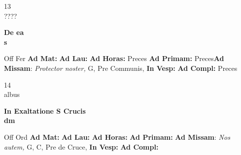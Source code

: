 \documentclass[10pt, openany]{book}
\begin{document}
    \begin{center}
        \begin{minipage}{3.5in}
            \vspace{2em}
            \begin{minipage}{0.5in}
                {\Huge 13} \\
                {\normalsize ????}
            \end{minipage}
            \begin{minipage}{3.0in}
                \textbf{ \large De ea \\
                \textnormal{\normalsize s}}

            \end{minipage}
            \begin{justify}Off Fer
                \textbf{Ad Mat: }
                \textbf{Ad Lau: }
                \textbf{Ad Horas: }Preces
                \textbf{Ad Primam: }Preces\textbf{Ad Missam}: \textit{Protector noster,} G, Pre Communis, 
                \textbf{In Vesp: }
                \textbf{Ad Compl: }Preces
            \end{justify}
        \end{minipage}
    \end{center}

    \begin{center}
        \begin{minipage}{3.5in}
            \vspace{2em}
            \begin{minipage}{0.5in}
                {\Huge 14} \\
                {\normalsize albus}
            \end{minipage}
            \begin{minipage}{3.0in}
                \textbf{ \large In Exaltatione S Crucis \\
                \textnormal{\normalsize dm}}

            \end{minipage}
            \begin{justify}Off Ord
                \textbf{Ad Mat: }
                \textbf{Ad Lau: }
                \textbf{Ad Horas: }
                \textbf{Ad Primam: }\textbf{Ad Missam}: \textit{Nos autem,} G, C, Pre de Cruce, 
                \textbf{In Vesp: }
                \textbf{Ad Compl: }
            \end{justify}
        \end{minipage}
    \end{center}
\end{document}
